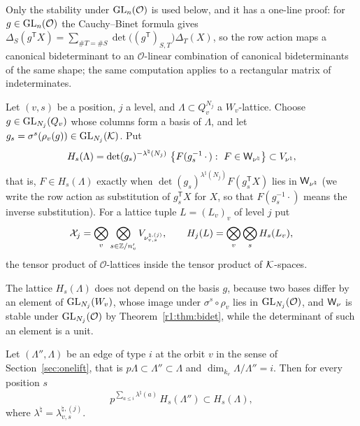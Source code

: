\noindent Only the stability under $\operatorname{GL}_n(\mathcal O)$ is used below, and it has a one-line proof: for $g\in\operatorname{GL}_n(\mathcal O)$ the Cauchy--Binet formula gives $\Delta_S(g^{\mathsf T}X)=\sum_{\#T=\#S}\det\big((g^{\mathsf T})_{S,T}\big)\Delta_T(X)$, so the row action maps a canonical bideterminant to an $\mathcal O$-linear combination of canonical bideterminants of the same shape; the same computation applies to a rectangular matrix of indeterminates.

\begin{definition}\label{r1:def:H}
Let $(v,s)$ be a position, $j$ a level, and $\Lambda\subset Q_v^{N_j}$ a $W_v$-lattice. Choose $g\in\operatorname{GL}_{N_j}(Q_v)$ whose columns form a basis of $\Lambda$, and let $g_s=\sigma^s(\rho_v(g))\in\operatorname{GL}_{N_j}(\mathcal K)$. Put
\[
H_{s}(\Lambda)=\det(g_s)^{-\lambda^\natural(N_j)}\ \big\{F(g_s^{-1}\,\cdot\,):\ F\in\Wl_{\nu^\natural}\big\}\subset V_{\nu^\natural},
\]
that is, $F\in H_s(\Lambda)$ exactly when $\det(g_s)^{\lambda^\natural(N_j)}F(g_s^{\mathsf T}X)$ lies in $\mathsf W_{\nu^\natural}$ (we write the row action as substitution of $g_s^{\mathsf T}X$ for $X$, so that $F(g_s^{-1}\cdot)$ means the inverse substitution). For a lattice tuple $L=(L_v)_v$ of level $j$ put
\[
\mathcal X_j=\bigotimes_v\bigotimes_{s\in\mathbb Z/n'_v}V_{\nu^{\natural,(j)}_{v,s}},\qquad H_j(L)=\bigotimes_v\bigotimes_sH_s(L_v),
\]
the tensor product of $\mathcal O$-lattices inside the tensor product of $\mathcal K$-spaces.
\end{definition}

The lattice $H_s(\Lambda)$ does not depend on the basis $g$, because two bases differ by an element of $\operatorname{GL}_{N_j}(W_v)$, whose image under $\sigma^s\circ\rho_v$ lies in $\operatorname{GL}_{N_j}(\mathcal O)$, and $\mathsf W_{\nu}$ is stable under $\operatorname{GL}_{N_j}(\mathcal O)$ by Theorem~\ref{r1:thm:bidet}, while the determinant of such an element is a unit.

\begin{lemma}[Edges]\label{r1:lem:edge}
Let $(\Lambda'',\Lambda)$ be an edge of type $i$ at the orbit $v$ in the sense of Section~\ref{sec:onelift}, that is $p\Lambda\subset\Lambda''\subset\Lambda$ and $\dim_{k_v}\Lambda/\Lambda''=i$. Then for every position $s$
\[
p^{\sum_{a\le i}\lambda^{\natural}(a)}\,H_s(\Lambda'')\subset H_s(\Lambda),
\]
where $\lambda^\natural=\lambda^{\natural,(j)}_{v,s}$.
\end{lemma}

